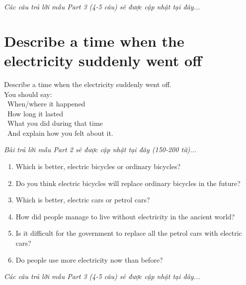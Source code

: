 \vspace{1em}
\textit{Các câu trả lời mẫu Part 3 (4-5 câu) sẽ được cập nhật tại đây...}
\vspace{2em}

\section{Describe a time when the electricity suddenly went off}
\begin{ieltsprompt}
Describe a time when the electricity suddenly went off. \\
You should say: \\
\textbullet\ When/where it happened \\
\textbullet\ How long it lasted \\
\textbullet\ What you did during that time \\
\textbullet\ And explain how you felt about it. \\
\end{ieltsprompt}

\vspace{1em}
\textit{Bài trả lời mẫu Part 2 sẽ được cập nhật tại đây (150-200 từ)...}
\vspace{2em}

\begin{ieltsprompt}
\begin{enumerate}[itemsep=4pt]
    \item Which is better, electric bicycles or ordinary bicycles?
    \item Do you think electric bicycles will replace ordinary bicycles in the future?
    \item Which is better, electric cars or petrol cars?
    \item How did people manage to live without electricity in the ancient world?
    \item Is it difficult for the government to replace all the petrol cars with electric cars?
    \item Do people use more electricity now than before?
\end{enumerate}
\end{ieltsprompt}

\vspace{1em}
\textit{Các câu trả lời mẫu Part 3 (4-5 câu) sẽ được cập nhật tại đây...}
\vspace{2em}

